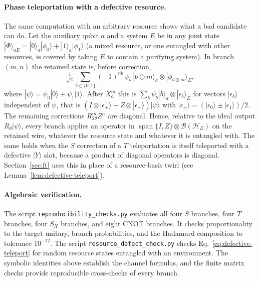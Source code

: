 \documentclass[aps,prx,reprint,superscriptaddress,nofootinbib,floatfix,longbibliography]{revtex4-2}
\theoremstyle{definition}
\begin{document}
\paragraph{Phase teleportation with a defective resource.}
The same computation with an arbitrary resource shows what a bad candidate
can do.  Let the auxiliary qubit $a$ and a system $E$ be in any joint state
$|\Phi\rangle_{aE}=|0\rangle_a|\phi_0\rangle+|1\rangle_a|\phi_1\rangle$ (a mixed
resource, or one entangled with other resources, is covered by taking $E$ to
contain a purifying system).  In
branch $(m,n)$ the retained state is, before correction,
\begin{equation}
 \tfrac{1}{\sqrt2}\sum_{b\in\{0,1\}}(-1)^{nb}\,\psi_b\,
 |b\oplus m\rangle_a\otimes|\phi_{b\oplus m}\rangle_E ,
 \label{eq:defective-teleport}
\end{equation}
where $|\psi\rangle=\psi_0|0\rangle+\psi_1|1\rangle$.  After $X_a^m$ this is
$\sum_b\psi_b|b\rangle_a\otimes|\epsilon_b\rangle_E$ for vectors
$|\epsilon_b\rangle$ independent of $\psi$, that is
$(I\otimes|\epsilon_+\rangle+Z\otimes|\epsilon_-\rangle)|\psi\rangle$ with
$|\epsilon_\pm\rangle=(|\epsilon_0\rangle\pm|\epsilon_1\rangle)/2$.  The
remaining corrections $R_{2\theta}^mZ^n$ are diagonal.  Hence, relative to the
ideal output $R_\theta|\psi\rangle$, every branch applies an operator in
$\operatorname{span}\{I,Z\}\otimes\mathcal B(\mathcal H_E)$ on the retained
wire, whatever the resource state and whatever it is entangled with.  The
same holds when the $S$ correction of a $T$ teleportation is itself
teleported with a defective $|Y\rangle$ slot, because a product of diagonal
operators is diagonal.  Section~\ref{sec:ft} uses this in place of a
resource-basis twirl (see Lemma~\ref{lem:defective-teleport}).

\paragraph{Algebraic verification.}
The script \texttt{reproducibility\_checks.py} evaluates all four $S$ branches, four $T$ branches, four $S_X$ branches, and eight CNOT branches.  It checks proportionality to the target unitary, branch probabilities, and the Hadamard composition to tolerance $10^{-12}$.  The script \texttt{resource\_defect\_check.py} checks Eq.~\eqref{eq:defective-teleport} for random resource states entangled with an environment.  The symbolic identities above establish the channel formulas, and the finite matrix checks provide reproducible cross-checks of every branch.
\end{document}
